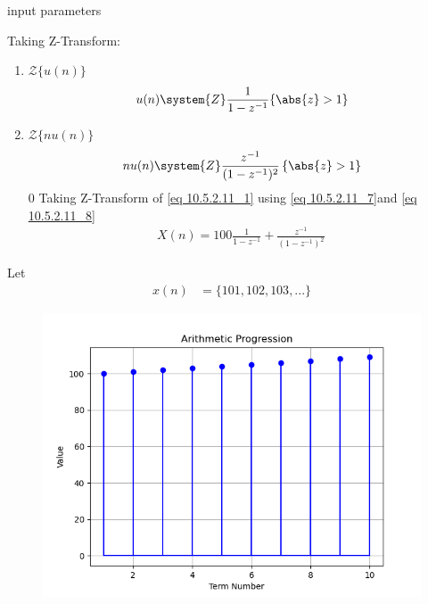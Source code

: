 \documentclass[journal,12pt,onecolumn]{IEEEtran}
\theoremstyle{remark}
\begin{document}
 
 \begin{table}[!ht]
    \centering
        
    \caption{input parameters}
    \label{tab:10_5_2_11}
\end{table}
Taking Z-Transform:
\begin{enumerate}
    \item $\mathcal{Z}\{u(n)\}$
\begin{align}
    u(n) \system{Z} \frac{1}{1-z^{-1}} \{\abs{z} > 1\} \label{eq 10.5.2.11_7}
\end{align}
    \item $\mathcal{Z}\{nu(n)\}$ 
\begin{align}
    nu(n) \system{Z} \frac{z^{-1}}{(1-z^{-1})^2}\, \{\abs{z} > 1\} \label{eq 10.5.2.11_8} 
\end{align}0
Taking Z-Transform of \eqref{eq 10.5.2.11_1} using \eqref{eq 10.5.2.11_7}and \eqref{eq 10.5.2.11_8}
\begin{align}
    X(n)=100\frac{1}{1-z^{-1}} +\frac{z^{-1}}{(1-z^{-1})^2}\
\end{align}
\end{enumerate}
Let \\
\begin{align}
x(n)&= \lbrace 101,102,103,...\rbrace 
\end{align}
\begin{figure}
    \centering
    \includegraphics{ncert-maths/10/5/2/11/figs/fig1.png}
    \caption{ }
\end{figure}
 
\end{document}
